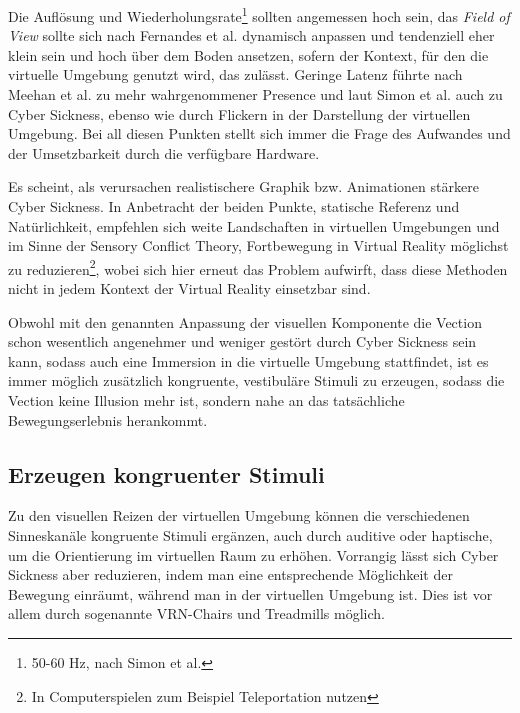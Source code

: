 Die Aufl\"osung und Wiederholungsrate\footnote{50-60 Hz, nach Simon et al.\cite{Simon:2014:Factors}} sollten angemessen hoch sein\cite{kirollos:2019:refresh}, das \textit{Field of View} sollte sich nach Fernandes et al.\cite{Fenandes:2016:FOV} dynamisch anpassen und tendenziell eher klein sein und hoch \"uber dem Boden ansetzen, sofern der Kontext, f\"ur den die virtuelle Umgebung genutzt wird, das zul\"asst. Geringe Latenz f\"uhrte nach Meehan et al.\cite{Meehan:2003:latency} zu mehr wahrgenommener Presence und laut Simon et al.\cite{Simon:2014:Factors} auch zu Cyber Sickness, ebenso wie durch Flickern in der Darstellung der virtuellen Umgebung.
Bei all diesen Punkten stellt sich immer die Frage des Aufwandes und der Umsetzbarkeit durch die verf\"ugbare Hardware.

Es scheint, als verursachen realistischere Graphik bzw. Animationen st\"arkere Cyber Sickness\cite{Pouke:2018:Realism}.
In Anbetracht der beiden Punkte, statische Referenz und Nat\"urlichkeit, empfehlen sich weite Landschaften in virtuellen Umgebungen und im Sinne der Sensory Conflict Theory, Fortbewegung in Virtual Reality m\"oglichst zu reduzieren\footnote{In Computerspielen zum Beispiel Teleportation nutzen}, wobei sich hier erneut das Problem aufwirft, dass diese Methoden nicht in jedem Kontext der Virtual Reality einsetzbar sind.

Obwohl mit den genannten Anpassung der visuellen Komponente die Vection schon wesentlich angenehmer und weniger gest\"ort durch Cyber Sickness sein kann, sodass auch eine Immersion in die virtuelle Umgebung stattfindet, ist es immer m\"oglich zus\"atzlich kongruente, vestibul\"are Stimuli zu erzeugen, sodass die Vection keine Illusion mehr ist, sondern nahe an das tats\"achliche Bewegungserlebnis herankommt.


\subsection{Erzeugen kongruenter Stimuli}\label{Vestibular}

Zu den visuellen Reizen der virtuellen Umgebung k\"onnen die verschiedenen Sinneskan\"ale kongruente Stimuli erg\"anzen, auch durch auditive oder haptische, um die Orientierung im virtuellen Raum zu erh\"ohen. Vorrangig l\"asst sich Cyber Sickness aber reduzieren, indem man eine entsprechende M\"oglichkeit der Bewegung einr\"aumt, w\"ahrend man in der virtuellen Umgebung ist. Dies ist vor allem durch sogenannte VRN-Chairs und Treadmills m\"oglich.

